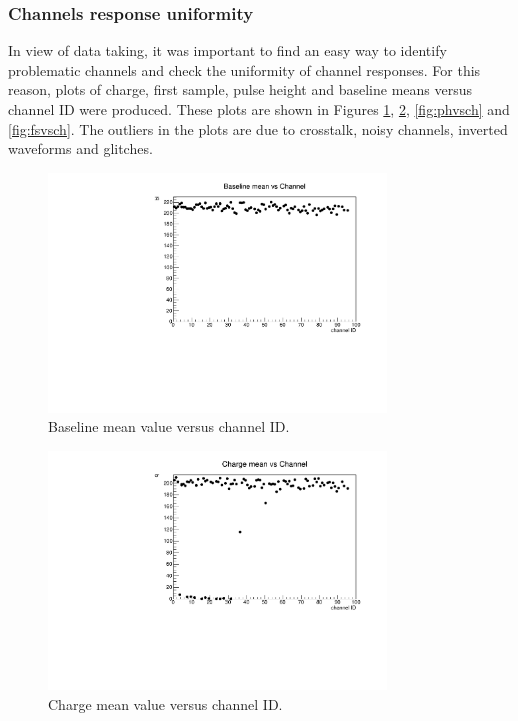 \subsubsection{Channels response uniformity}
In view of data taking, it was important to find an easy way to identify problematic channels and check the uniformity of channel responses. 
For this reason, plots of charge, first sample, pulse height and baseline means versus channel ID were produced. 
These plots are shown in Figures \ref{fig:blvsch}, \ref{fig:qvsch}, \ref{fig:phvsch} and \ref{fig:fsvsch}. 
The outliers in the plots are due to crosstalk, noisy channels, inverted waveforms and glitches.

\begin{figure}[!h]
  \centering
  \includegraphics[width=0.8\textwidth]{figures/pdf/bl_vs_ch1.pdf}
  \caption{Baseline mean value versus channel ID.}
  \label{fig:blvsch}
\end{figure}
\begin{figure}[!h]
  \centering
  \includegraphics[width=0.8\textwidth]{figures/pdf/q_vs_ch1.pdf}
  \caption{Charge mean value versus channel ID.}
  \label{fig:qvsch}
\end{figure}
